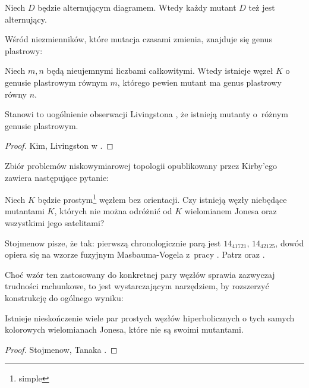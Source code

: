\begin{proposition}
    Niech $D$ będzie alternującym diagramem.
    Wtedy każdy mutant $D$ też jest alternujący.
\end{proposition}

Wśród niezmienników, które mutacja czasami zmienia, znajduje się genus plastrowy:

\begin{proposition}
%
    Niech $m, n$ będą nieujemnymi liczbami całkowitymi.
    Wtedy istnieje węzeł $K$ o genusie plastrowym równym $m$, którego pewien mutant ma genus plastrowy równy $n$.
\end{proposition}

Stanowi to uogólnienie obserwacji Livingstona \cite{livingston83}, że istnieją mutanty o~różnym genusie plastrowym.
%

\begin{proof}
    Kim, Livingston w \cite{kim05}.
\end{proof}

Zbiór problemów niskowymiarowej topologii opublikowany przez Kirby'ego \cite{kirby78} zawiera następujące pytanie:
%

\begin{conjecture}[problem 1.91]
    Niech $K$ będzie prostym\footnote{simple} węzłem bez orientacji.
    Czy istnieją węzły niebędące mutantami $K$, których nie można odróżnić od $K$ wielomianem Jonesa oraz wszystkimi jego satelitami?
\end{conjecture}

Stojmenow pisze, że tak: pierwszą chronologicznie parą jest $14_{41721}$, $14_{42125}$, dowód opiera się na wzorze fuzyjnym Masbauma-Vogela z~pracy \cite{masbaum94}.
%
%
%
Patrz \cite[przykład 3.3]{tanaka09} oraz \cite[przykład 3.2]{stoimenow10}.

Choć wzór ten zastosowany do konkretnej pary węzłów sprawia zazwyczaj trudności rachunkowe, to jest wystarczającym narzędziem, by rozszerzyć konstrukcję do ogólnego wyniku:

\begin{proposition}
    Istnieje nieskończenie wiele par prostych węzłów hiperbolicznych o tych samych kolorowych wielomianach Jonesa, które nie są swoimi mutantami.
\end{proposition}

\begin{proof}
    Stojmenow, Tanaka \cite[tw. 1.1]{tanaka09}.
\end{proof}


